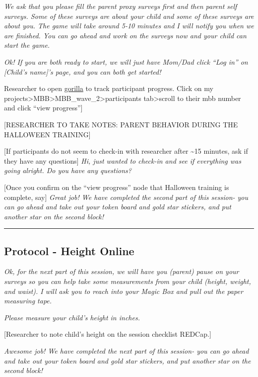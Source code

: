 \documentclass[]{book}
\begin{document}
\emph{We ask that you please fill the parent proxy surveys first and then parent self surveys. Some of these surveys are about your child and some of these surveys are about you. The game will take around 5-10 minutes and I will notify you when we are finished. You can go ahead and work on the surveys now and your child can start the game.}

\emph{Ok! If you are both ready to start, we will just have Mom/Dad click ``Log in'' on {[}Child's name{]}'s page, and you can both get started!}

Researcher to open \href{https://gorilla.sc}{gorilla} to track participant progress. Click on my projects\textgreater{}MBB\textgreater{}MBB\_wave\_2\textgreater{}participants tab\textgreater{}scroll to their mbb number and click ``view progress''{]}

{[}RESEARCHER TO TAKE NOTES: PARENT BEHAVIOR DURING THE HALLOWEEN TRAINING{]}

{[}If participants do not seem to check-in with researcher after \textasciitilde{}15 minutes, ask if they have any questions{]} \emph{Hi, just wanted to check-in and see if everything was going alright. Do you have any questions?}

{[}Once you confirm on the ``view progress'' node that Halloween training is complete, say{]} \emph{Great job! We have completed the second part of this session- you can go ahead and take out your token board and gold star stickers, and put another star on the second block!}

\begin{center}\rule{0.5\linewidth}{0.5pt}\end{center}

\hypertarget{protocol---height-online-1}{%
\subsection{Protocol - Height Online}\label{protocol---height-online-1}}

\emph{Ok, for the next part of this session, we will have you (parent) pause on your surveys so you can help take some measurements from your child (height, weight, and waist). I will ask you to reach into your Magic Box and pull out the paper measuring tape.}

\emph{Please measure your child's height in inches.}

{[}Researcher to note child's height on the session checklist REDCap.{]}

\emph{Awesome job! We have completed the next part of this session- you can go ahead and take out your token board and gold star stickers, and put another star on the second block!}
\end{document}
